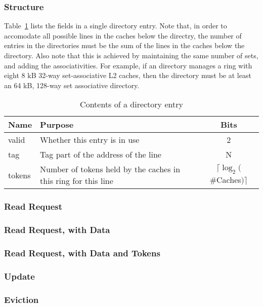 \subsubsection{Structure}
Table~\ref{table:directory_contents} lists the fields in a single directory entry. Note that, in order to accomodate all possible lines in the caches below the directry, the number of entries in the directories must be the sum of the lines in the caches below the directory. Also note that this is achieved by maintaining the same number of sets, and adding the associativities. For example, if an directory manages a ring with eight 8 kB 32-way set-associative L2 caches, then the directory must be at least an 64 kB, 128-way set associative directory.

\begin{table}
\begin{center}
\begin{tabularx}{\textwidth}{|l|X|c|}
\hline
Name & Purpose & Bits\\
\hline
\hline
valid & Whether this entry is in use & 2 \\
tag & Tag part of the address of the line & N \\
tokens & Number of tokens held by the caches in this ring for this line & $\lceil \log_2($\#Caches$)\rceil$ \\
\hline
\end{tabularx}
\caption{Contents of a directory entry}
\label{table:directory_contents}
\end{center}
\end{table}

\subsubsection{Read Request}
\subsubsection{Read Request, with Data}
\subsubsection{Read Request, with Data and Tokens}
\subsubsection{Update}
\subsubsection{Eviction}



